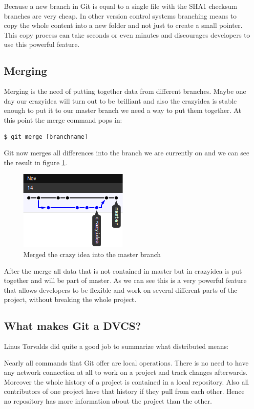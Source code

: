 Because a new branch in Git is equal to a single
file with the SHA1 checksum branches are very cheap. In other version control systems branching means to
copy the whole content into a new folder and not just to create a small pointer. This copy process can take seconds or even minutes and discourages developers to use
this powerful feature. \cite[chapter 3.1]{gitpro2009}

\subsection {Merging}

Merging is the need of putting together data from different branches. Maybe one
day our crazyidea will turn out to be brilliant and also the crazyidea is
stable enough to put it to our master branch we need a way to put them together.
At this point the merge command pops in:

\begin{lstlisting}
$ git merge [branchname]
\end{lstlisting}

Git now merges all differences into the branch we are currently on and we can see
the result in figure \ref{fig:crazyidea_merge}.
\begin{figure}[h]
  \centering 
  \includegraphics{img/merge1}
  \caption{Merged the crazy idea into the master branch}
  \label{fig:crazyidea_merge}
\end{figure}

After the merge all data that is not contained in master but in crazyidea is put
together and will be part of master. As we can see this is a very powerful feature
that allows developers to be flexible and work on several different parts of the
project, without breaking the whole project. \cite[page 30-31]{gitinternals2008}

\subsection {What makes Git a DVCS?}

Linus Torvalds did quite a good job to summarize what distributed means:

 \cite{googletechtalk2007}

Nearly all commands that Git offer are local operations. There is no need to
have any network connection at all to work on a project and track changes
afterwards. Moreover the whole history of a project is contained in a
local repository. Also all contributors of one project have that history if
they pull from each other. Hence no repository has more information about the project
than the other.

